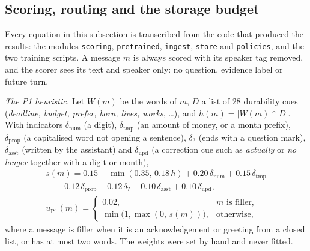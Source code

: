 \subsection{Scoring, routing and the storage budget}
\label{sec:equations}

Every equation in this subsection is transcribed from the code that produced
the results: the modules \texttt{scoring}, \texttt{pretrained},
\texttt{ingest}, \texttt{store} and \texttt{policies}, and the two training
scripts.
A message $m$ is always scored with its speaker tag removed, and the scorer
sees its text and speaker only: no question, evidence label or future turn.

\emph{The P1 heuristic.} Let $W(m)$ be the words of $m$, $D$ a list of 28
durability cues (\emph{deadline, budget, prefer, born, lives, works},
\ldots), and $h(m)=|W(m)\cap D|$. With indicators $\delta_{\mathrm{num}}$ (a
digit), $\delta_{\mathrm{tmp}}$ (an amount of money, or a month prefix),
$\delta_{\mathrm{prop}}$ (a capitalised word not opening a sentence),
$\delta_{?}$ (ends with a question mark), $\delta_{\mathrm{asst}}$ (written
by the assistant) and $\delta_{\mathrm{upd}}$ (a correction cue such as
\emph{actually} or \emph{no longer} together with a digit or month),
\begin{equation}
\label{eq:p1}
\begin{gathered}
s(m)=0.15+\min(0.35,\,0.18\,h)+0.20\,\delta_{\mathrm{num}}+0.15\,\delta_{\mathrm{tmp}}\\
\quad{}+0.12\,\delta_{\mathrm{prop}}-0.12\,\delta_{?}-0.10\,\delta_{\mathrm{asst}}+0.10\,\delta_{\mathrm{upd}},\\[2pt]
u_{\mathrm{P1}}(m)=
\begin{cases}
0.02, & m \text{ is filler},\\
\min\big(1,\max(0,\,s(m))\big), & \text{otherwise,}
\end{cases}
\end{gathered}
\end{equation}
where a message is filler when it is an
acknowledgement or greeting from a closed list, or has at most two words.
The weights were set by hand and never fitted.

